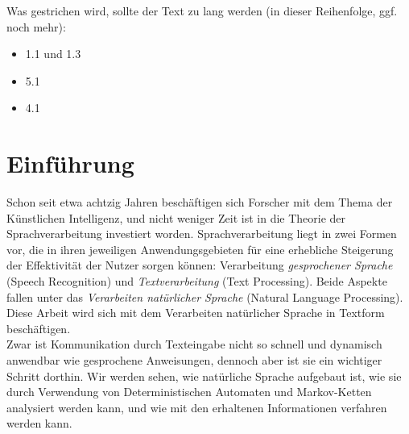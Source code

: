 \documentclass[12pt,twoside]{article}
\theoremstyle{plain}
\theoremstyle{definition}
\theoremstyle{remark}
\begin{document}
\setcounter{tocdepth}{2} 					%
\tableofcontents
{}
\clearpage


Was gestrichen wird, sollte der Text zu lang werden (in dieser Reihenfolge, ggf. noch mehr):
\begin{itemize}
	\item 1.1 und 1.3
	\item 5.1
	\item 4.1
\end{itemize}
\section{Einführung}
\label{sec:intro}
	Schon seit etwa achtzig Jahren beschäftigen sich Forscher mit dem Thema der Künstlichen Intelligenz, und nicht weniger Zeit ist in die Theorie der Sprachverarbeitung investiert worden.
	Sprachverarbeitung liegt in zwei Formen vor, die in ihren jeweiligen Anwendungsgebieten für eine erhebliche Steigerung der Effektivität der Nutzer sorgen können: Verarbeitung \textit{gesprochener Sprache} (Speech Recognition) und \textit{Textverarbeitung} (Text Processing).
	Beide Aspekte fallen unter das \textit{Verarbeiten natürlicher Sprache} (Natural Language Processing).
	Diese Arbeit wird sich mit dem Verarbeiten natürlicher Sprache in Textform beschäftigen.\\
	Zwar ist Kommunikation durch Texteingabe nicht so schnell und dynamisch anwendbar wie gesprochene Anweisungen, dennoch aber ist sie ein wichtiger Schritt dorthin.
	Wir werden sehen, wie natürliche Sprache aufgebaut ist, wie sie durch Verwendung von Deterministischen Automaten und Markov-Ketten analysiert werden kann, und wie mit den erhaltenen Informationen verfahren werden kann.
\end{document}
